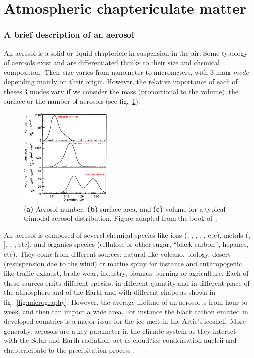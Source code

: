 \documentclass[a4paper,12pt]{memoir}
\newcommand{\NOt}{\ce{NO3^-}}
\newcommand{\SOq}{\ce{SO4^2-}}
\begin{document}
\section{Atmospheric chaptericulate matter}%
\label{sec:atmospheric_chaptericulate_matter}
\subsubsection{A brief description of an aerosol}%
\label{ssub:a_brief_description_of_an_aerosol}

An aerosol is a solid or liquid chaptericle in suspension in the air.  Some
typology of aerosols exist and are differentiated thanks to their size and
chemical composition.  Their size varies from nanometer to micrometers, with 3
main \emph{mode} depending mainly on their origin.  However, the relative
importance of each of theses 3 modes vary if we consider the mass (proportional
to the volume), the surface or the number of aerosols (see
fig.~\ref{fig:aerosolDistribution}). 

\begin{figure}[h]
    \centering
    \includegraphics[width=0.4\textwidth]{aerosolDistribution.pdf}
    \caption{\textbf{(a)} Aerosol number, \textbf{(b)} surface area, and
        \textbf{(c)} volume for a typical trimodal aerosol
        distribution.  Figure adapted from the
    book of~\citet{seinfield_atmospheric_1998}.}
    \label{fig:aerosolDistribution}
\end{figure}

An aerosol is composed of several chemical species like ions (\SOq, \NOt, ,
, , etc), metals (, ], , , etc), and organics species
(cellulose or other sugar, “black carbon”, hopanes, etc).  They come from different
sources: natural like volcano, biology, desert (resuspension due to the wind) or marine
spray for instance and anthropogenic like traffic exhaust, brake wear, industry, biomass
burning or agriculture.  Each of these sources emits different species, in different
quantity and in different place of the atmosphere and of the Earth and with different
shape as shown in fig.~\ref{fig:micrography}.  However, the average lifetime of an aerosol
is from hour to week, and then can impact a wide area.  For instance the black carbon
emitted in developed countries is a major issue for the ice melt in the Artic's iceshelf.
More generally, aerosols are a key parameter in the climate system as they interact with
the Solar and Earth radiation, act as cloud/ice condensation nucleii and chaptericipate to
the precipitation process \citep{boucher_clouds_2013}.
\end{document}
